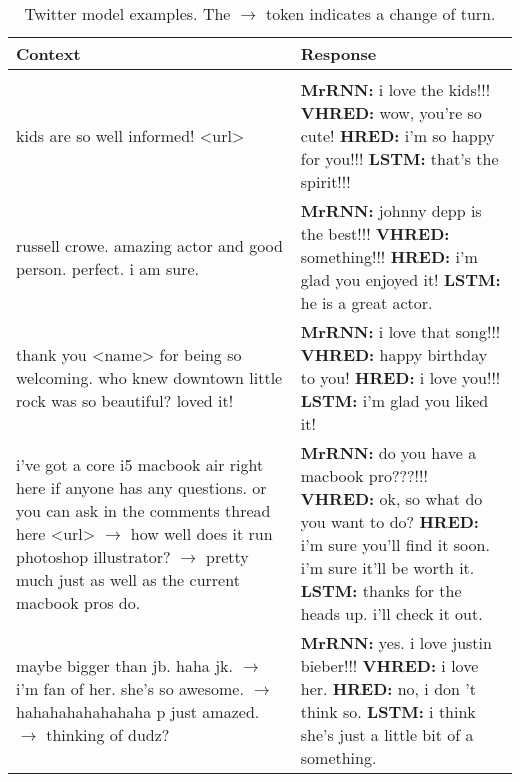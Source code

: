 \documentclass{article}
\begin{document}
\begin{table}[ht]
 \caption{Twitter model examples. The $\rightarrow$ token indicates a change of turn.}
 \label{table:twitter-examples}
 \scriptsize
 \centering
 \begin{tabular}{p{45mm}|p{80mm}}
 \textbf{Context} & \textbf{Response} \\ \hline \\ \hline 
     kids are so well informed! <url> & \textbf{MrRNN:} i love the kids!!!  \newline \textbf{VHRED:} wow, you're so cute! \newline \textbf{HRED:} i'm so happy for you!!! \newline \textbf{LSTM:} that's the spirit!!! \\ \hline 
     russell crowe. amazing actor and good person. perfect. i am sure. & \textbf{MrRNN:} johnny depp is the best!!!  \newline \textbf{VHRED:} something!!! \newline \textbf{HRED:} i'm glad you enjoyed it! \newline \textbf{LSTM:} he is a great actor. \\ \hline 
     thank you <name> for being so welcoming. who knew downtown little rock was so beautiful? loved it! & \textbf{MrRNN:} i love that song!!!  \newline \textbf{VHRED:} happy birthday to you! \newline \textbf{HRED:} i love you!!! \newline \textbf{LSTM:} i'm glad you liked it! \\ \hline 
     i've got a core i5 macbook air right here if anyone has any questions. or you can ask in the comments thread here <url> $\rightarrow$ how well does it run photoshop illustrator? $\rightarrow$ pretty much just as well as the current macbook pros do. & \textbf{MrRNN:} do you have a macbook pro???!!!  \newline \textbf{VHRED:} ok, so what do you want to do? \newline \textbf{HRED:} i'm sure you'll find it soon. i'm sure it'll be worth it. \newline \textbf{LSTM:} thanks for the heads up. i'll check it out.  \\ \hline 
     maybe bigger than jb. haha jk. $\rightarrow$ i'm fan of her. she's so awesome. $\rightarrow$ hahahahahahahaha p just amazed. $\rightarrow$ thinking of dudz? & \textbf{MrRNN:} yes. i love justin bieber!!!  \newline \textbf{VHRED:} i love her. \newline \textbf{HRED:} no, i don 't think so. \newline \textbf{LSTM:} i think she's just a little bit of a something.  \\ \hline 

\end{tabular}
\end{table}
\end{document}
